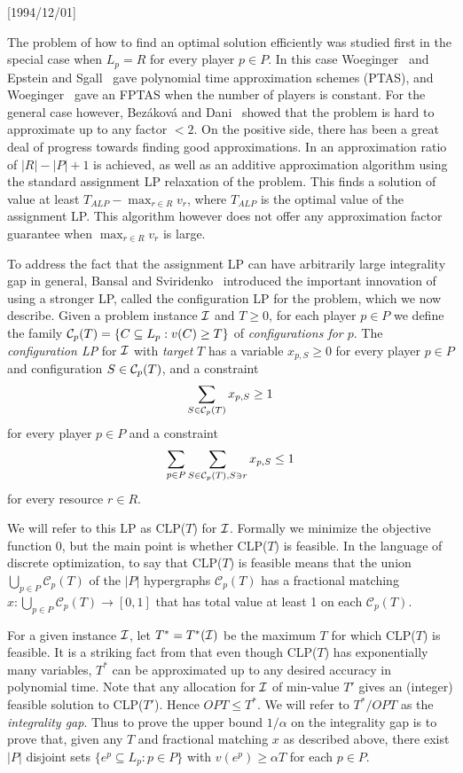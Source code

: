 \NeedsTeXFormat{LaTeX2e}[1994/12/01]\documentclass[letterpaper, 11pt]{article}
\theoremstyle{definition}
\theoremstyle{remark}
\numberwithin{equation}{section}
\newcommand{\cC}{\mathcal{C}}
\begin{document}
The problem of how to find an optimal solution efficiently
was studied first in the special case when $L_p=R$ for
every player $p\in P$. In this case Woeginger~\cite{woeginger97} and Epstein and
Sgall~\cite{epsteinsgall} gave polynomial time approximation schemes (PTAS),
and Woeginger~\cite{woeginger00} gave an FPTAS when the number of
players is constant.
For the general case however, Bez\'akov\'a and Dani~\cite{bezakovadani}
showed that the problem is hard to approximate up to any factor $< 2$. 
On the positive side, there has been a great deal of progress towards finding
good approximations. In \cite{bezakovadani} an approximation
ratio of $|R|-|P|+1$ is achieved, as well as an additive approximation
algorithm using the standard assignment LP relaxation of the
problem. This finds a solution of value at least $T_{ALP}-\max_{r\in R} v_r$,
where $T_{ALP}$ is the optimal value of the assignment LP.
This algorithm however does not offer any approximation factor
guarantee when
$\max_{r\in R} v_r$ is large. 

To address the fact that the assignment LP can have arbitrarily large
integrality gap in general, 
Bansal and Sviridenko~\cite{bansalsviridenko} introduced the important
innovation of using a stronger LP, called the configuration LP for the
problem, which we now describe.
Given a problem instance ${\cal I}$ and $T\geq 0$, for each player $p\in P$
we define the family ${\cal
  C}_p(T) = \{ C \subseteq L_p: v(C) \geq T \}$ of {\em configurations for
$p$}. The {\em configuration LP} for ${\cal I}$ with {\em target} $T$ has a variable 
$x_{p,S} \geq 0$ for every player $p\in P$ and configuration
$S\in {\cal C}_p(T)$, and a constraint
$$\sum_{S\in {\cal C}_p(T)} x_{p,S} \geq 1$$ 
for every player $p\in P$ and a constraint
$$\sum_{p\in P} \sum_{S\in {\cal C}_p(T), S\ni r} x_{p,S} \leq 1$$
for every resource $r\in R$.

We will refer to this LP as CLP($T$) for ${\cal I}$.
Formally we minimize the objective function $0$, but the main point is
whether CLP($T$) is feasible. In the language of discrete optimization,
to say that CLP($T$) is feasible means that the union $\bigcup_{p\in
  P}\cC_p(T)$ of the $|P|$ hypergraphs $\cC_p(T)$ has a fractional
matching $x: \bigcup_{p\in
  P}\cC_p(T) \rightarrow [0,1]$ that has total value at least 1 on each $\cC_p(T)$.

For a given instance ${\cal I}$, let $T^* = T^*({\cal I})$ be the
maximum $T$ for which CLP($T$) is feasible. 
It is a striking fact from \cite{bansalsviridenko} that even though
CLP($T$) has exponentially many variables, $T^*$ can be
approximated up to any desired accuracy in polynomial time.
Note that any allocation for ${\cal I}$ of min-value $T'$ gives an (integer)
feasible solution to CLP($T'$). Hence $OPT\leq T^*$.
We will refer to $T^*/OPT$ as the {\em integrality gap}. Thus
  to prove the upper bound $1/\alpha$ on the integrality gap is to
  prove that, given any $T$ and fractional matching $x$ as described above,
  there exist $|P|$ disjoint sets $\{e^p\subseteq L_p:p\in P\}$ with
  $v(e^p)\geq\alpha T$ for each $p\in P$.
\end{document}

